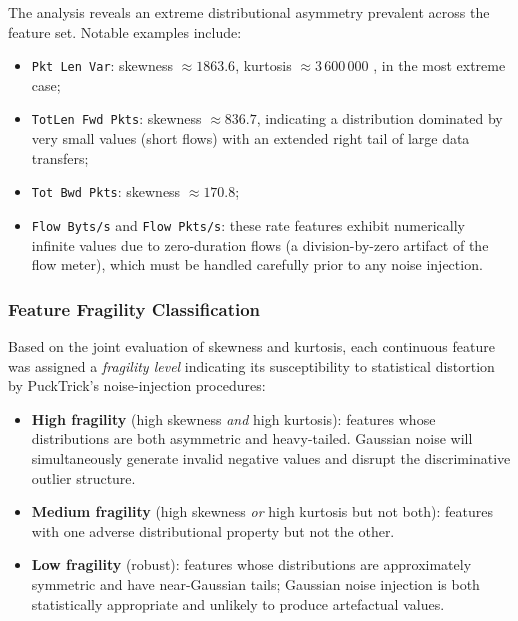 \documentclass[../main.tex]{subfiles}
\begin{document}
The analysis reveals an extreme distributional asymmetry prevalent across the
feature set.  Notable examples include:

\begin{itemize}
  \item \texttt{Pkt Len Var}: skewness $\approx 1863.6$, kurtosis $\approx 3\,600\,000$ , in the most extreme case;
  \item \texttt{TotLen Fwd Pkts}: skewness $\approx 836.7$, indicating a distribution dominated by very small values (short flows) with an extended right tail of large data transfers;
  \item \texttt{Tot Bwd Pkts}: skewness $\approx 170.8$;
  \item \texttt{Flow Byts/s} and \texttt{Flow Pkts/s}: these rate features exhibit numerically infinite values due to zero-duration flows (a division-by-zero artifact of the flow meter), which must be handled carefully prior to any noise injection.
\end{itemize}

\subsubsection{Feature Fragility Classification}
\label{sec:fragility}

Based on the joint evaluation of skewness and kurtosis, each continuous feature was assigned a \emph{fragility level} indicating its susceptibility to statistical distortion by PuckTrick's noise-injection procedures:

\begin{itemize}
  \item \textbf{High fragility} (high skewness \emph{and} high kurtosis): features whose distributions are both asymmetric and heavy-tailed. Gaussian noise will simultaneously generate invalid negative values and disrupt the discriminative outlier structure.
  \item \textbf{Medium fragility} (high skewness \emph{or} high kurtosis but not both): features with one adverse distributional property but not the other.
  \item \textbf{Low fragility} (robust): features whose distributions are approximately symmetric and have near-Gaussian tails; Gaussian noise injection is both statistically appropriate and unlikely to produce artefactual values.
\end{itemize}
\end{document}

